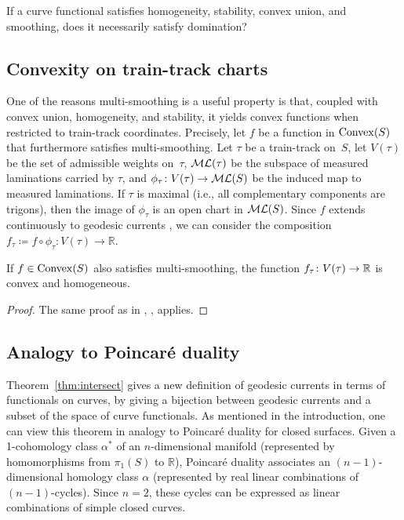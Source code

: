 \begin{question}
If a curve functional satisfies homogeneity, stability,
convex union, and smoothing, does it necessarily satisfy domination?
\end{question}

\subsection{Convexity on train-track charts}
\label{sec:convexity_charts}

One of the reasons multi-smoothing is a useful property is that,
coupled with convex union, homogeneity, and stability, it
yields convex functions when restricted to train-track coordinates.
Precisely, let $f$ be a function in $\mathrm{Convex}(S)$ that furthermore
satisfies multi-smoothing. Let $\tau$ be a train-track on~$S$, let
$V(\tau)$ be the set of admissible weights on~$\tau$, $\mathcal{ML}(\tau)$ be the subspace of
measured laminations carried by $\tau$, and
$\phi_{\tau} \colon V(\tau) \to \mathcal{ML}(S)$ be the induced
map to measured laminations. If $\tau$ is maximal (i.e., all complementary
components are trigons), then the image of $\phi_\tau$ is an open
chart in $\mathcal{ML}(S)$.
Since $f$ extends continuously to geodesic currents
\cite[Theorem~A]{MGT21:Smoothings}, we can consider the composition
$f_{\tau} \coloneqq f \circ \phi_{\tau} \colon V(\tau) \to
\mathbb{R}$.

\begin{proposition}\label{prop:convexity-charts}
  If $f \in \mathrm{Convex}(S)$ also satisfies multi-smoothing, the function
  $f_\tau \colon V(\tau) \to \mathbb{R}$ is convex and homogeneous.
\end{proposition}

\begin{proof}
  The same proof as in
  \cite[Appendix~A]{Mir04:SimpleGeodesics},
  \cite[Theorem~2]{Thu16:Research},
  \cite[Theorem~4.7]{AH21:EffectiveCounting3} applies.
\end{proof}

\subsection{Analogy to Poincar\'e duality}
\label{subsec:poincare_duality}
Theorem~\ref{thm:intersect} gives a new definition of geodesic currents in terms of functionals on curves, by giving a bijection between geodesic currents and a subset of the space of curve functionals.
As mentioned in the introduction, one can view this theorem in analogy to Poincaré duality for closed surfaces.  Given a 1-cohomology class $\alpha^*$ of an $n$-dimensional manifold (represented by homomorphisms from $\pi_1(S)$ to $\mathbb{R}$), Poincaré duality associates an $(n-1)$-dimensional homology class $\alpha$ (represented by real linear combinations of $(n-1)$-cycles). Since $n=2$, these cycles can be expressed as linear combinations of simple closed curves.  

